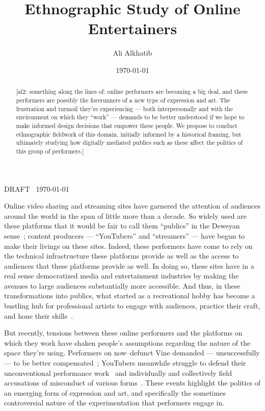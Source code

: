 \documentclass[10pt]{article}
\title{Ethnographic Study of Online Entertainers}
\author{Ali Alkhatib}
\date{\today}
\makeatletter
\def\maketitle{%
\par{\centering {\scshape \huge \textbf{\@title}}%
\par{\@author}
\par{DRAFT \DTMcurrenttime~\today}%
\par}}
\newcommand{\ali}[1]{{\color{Red}[al2: #1]}}
\newcommand{\topic}[1]{{\color{Blue}#1}}
\makeatother
\begin{document}
  \maketitle
  \begin{abstract}
  \ali{something along the lines of: online performers are becoming a big deal, and
       these performers are possibly the forerunners of a new type of expression and art.
       The frustration and turmoil they're experiencing
       --- both interpersonally and with the environment on which they ``work'' ---
       demands to be better understood if we hope to make informed design decisions that empower these people.
       We propose to conduct ethnographic fieldwork of this domain,
       initially informed by a historical framing, but
       ultimately studying how digitally mediated publics such as these affect
       the politics of this group of performers.}
  \end{abstract}



\topic{Online video sharing %
and streaming sites %
have garnered the attention of audiences around the world
in the span of little more than a decade.} %
So widely used are these platforms
that it would be fair to call them ``publics'' in the Deweyan sense~\cite{dewey2012public,disalvo2009design};
content producers
--- ``YouTubers'' and ``streamers'' ---
have begun to make their livings on these sites.
Indeed, these performers have come to rely on
the technical infrastructure these platforms provide as well as
the access to audiences that these platforms provide as well.
In doing so, these sites have in a real sense democratized media and entertainment industries by
making the avenues to large audiences substantially more accessible.
And thus, in these transformations into publics, what started as
a recreational hobby
has become a bustling hub for professional artists to
engage with audiences,
practice their craft, and 
hone their skills~\cite{Hamilton:2014:STF:2611105.2557048,Zhang:2015:CIL:2736084.2736091}.

\topic{But recently, tensions between these online performers and the platforms on which they work have shaken people's
assumptions regarding the nature of the space they're using.}
Performers on now--defunct Vine demanded --- unsuccessfully --- to be better compensated~\cite{vineWantsMoney,vineInsiderMeeting};
YouTubers meanwhile struggle to defend their unconventional performance work~\cite{h3h3Lawsuit}
and individually and collectively field accusations of misconduct of various forms~\cite{youtubeDramaResponses}.
These events highlight the politics of an emerging form of expression and art,
and specifically the sometimes controversial nature of the experimentation that performers engage in.
\end{document}
